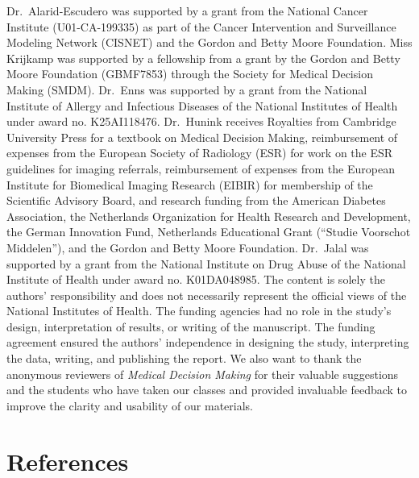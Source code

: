 \documentclass[
]{article}
\begin{document}
Dr.~Alarid-Escudero was supported by a grant from the National Cancer Institute (U01-CA-199335) as part of the Cancer Intervention and Surveillance Modeling Network (CISNET) and the Gordon and Betty Moore Foundation. Miss Krijkamp was supported by a fellowship from a grant by the Gordon and Betty Moore Foundation (GBMF7853) through the Society for Medical Decision Making (SMDM). Dr.~Enns was supported by a grant from the National Institute of Allergy and Infectious Diseases of the National Institutes of Health under award no. K25AI118476. Dr.~Hunink receives Royalties from Cambridge University Press for a textbook on Medical Decision Making, reimbursement of expenses from the European Society of Radiology (ESR) for work on the ESR guidelines for imaging referrals, reimbursement of expenses from the European Institute for Biomedical Imaging Research (EIBIR) for membership of the Scientific Advisory Board, and research funding from the American Diabetes Association, the Netherlands Organization for Health Research and Development, the German Innovation Fund, Netherlands Educational Grant (``Studie Voorschot Middelen''), and the Gordon and Betty Moore Foundation. Dr.~Jalal was supported by a grant from the National Institute on Drug Abuse of the National Institute of Health under award no. K01DA048985. The content is solely the authors' responsibility and does not necessarily represent the official views of the National Institutes of Health. The funding agencies had no role in the study's design, interpretation of results, or writing of the manuscript. The funding agreement ensured the authors' independence in designing the study, interpreting the data, writing, and publishing the report. We also want to thank the anonymous reviewers of \emph{Medical Decision Making} for their valuable suggestions and the students who have taken our classes and provided invaluable feedback to improve the clarity and usability of our materials.

\hypertarget{references}{%
\section*{References}\label{references}}
\end{document}
